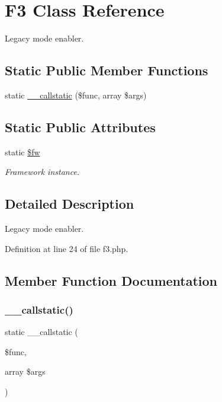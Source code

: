 \hypertarget{class_f3}{}\section{F3 Class Reference}
\label{class_f3}


Legacy mode enabler.  


\subsection*{Static Public Member Functions}
\begin{DoxyCompactItemize}
\item 
static \hyperlink{class_f3_ad42e603c4b2f548adb44326ff9044df5}{\+\_\+\+\_\+callstatic} (\$func, array \$args)
\end{DoxyCompactItemize}
\subsection*{Static Public Attributes}
\begin{DoxyCompactItemize}
\item 
\hypertarget{class_f3_a46ca319e1c33f8d54dc019eb351980df}{}\label{class_f3_a46ca319e1c33f8d54dc019eb351980df} 
static \hyperlink{class_f3_a46ca319e1c33f8d54dc019eb351980df}{\$fw}
\begin{DoxyCompactList}\small\item\em Framework instance. \end{DoxyCompactList}\end{DoxyCompactItemize}


\subsection{Detailed Description}
Legacy mode enabler. 

Definition at line 24 of file f3.\+php.



\subsection{Member Function Documentation}
\hypertarget{class_f3_ad42e603c4b2f548adb44326ff9044df5}{}\label{class_f3_ad42e603c4b2f548adb44326ff9044df5} 
\subsubsection{\texorpdfstring{\+\_\+\+\_\+callstatic()}{\_\_callstatic()}}
{\footnotesize\ttfamily static \+\_\+\+\_\+callstatic (\begin{DoxyParamCaption}\item[{}]{\$func,  }\item[{array}]{\$args }\end{DoxyParamCaption})\hspace{0.3cm}{\ttfamily [static]}}

